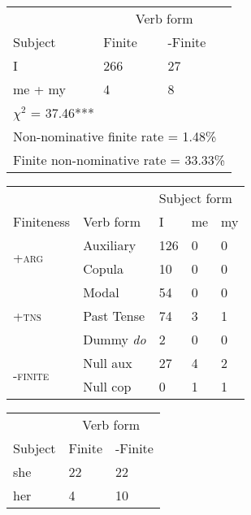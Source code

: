 \begin{table}[!h]
\begin{minipage}[t]{0.5\textwidth}
\begin{tabular}{@{}lll@{}}
        \toprule
         & \multicolumn{2}{c}{Verb form}\\
         \cline{2-3}
        Subject & Finite & -Finite \\
        \midrule
        I & 266 & 27 \\
        me + my  & 4 & 8\\
        \hline
        \multicolumn{3}{l}{$\chi^2$ = 37.46***} \\
         \multicolumn{3}{l}{Non-nominative finite rate = 1.48\%} \\
         \multicolumn{3}{l}{Finite non-nominative rate = 33.33\%}\\
        \bottomrule
    \end{tabular}
\end{minipage}
\vspace{1ex}
   \begin{minipage}[t]{0.5\textwidth}
    \centering
    \small
    \begin{tabular}{lllll}
    \toprule
 &  & \multicolumn{3}{l}{Subject form} \\ \cline{3-5} 
Finiteness & Verb form & I & me & my \\ \hline
\multirow{2}{*}{\textsc{+arg}} & Auxiliary & 126 & 0 & 0 \\
 & Copula & 10 & 0 & 0 \\ \hline
\multirow{3}{*}{\textsc{+tns}} & Modal & 54 & 0 & 0 \\
 & Past Tense & 74 & 3 & 1 \\
 & Dummy \textit{do} & 2 & 0 & 0 \\ \hline
\multirow{2}{*}{\textsc{-finite}} & Null aux & 27 & 4 & 2 \\
 & Null cop & 0 & 1 & 1\\
\bottomrule
\end{tabular}
\end{minipage}
\textbf{\linebreak}
\begin{minipage}[t]{0.5\textwidth}
    \centering
    \small
    \begin{tabular}{@{}lll@{}}
        \toprule
         & \multicolumn{2}{c}{Verb form}\\
         \cline{2-3}
        Subject & Finite & -Finite \\
        \midrule
        she & 22  & 22  \\
        her  & 4  & 10\\

\end{tabular}
\end{minipage}
\end{table}
